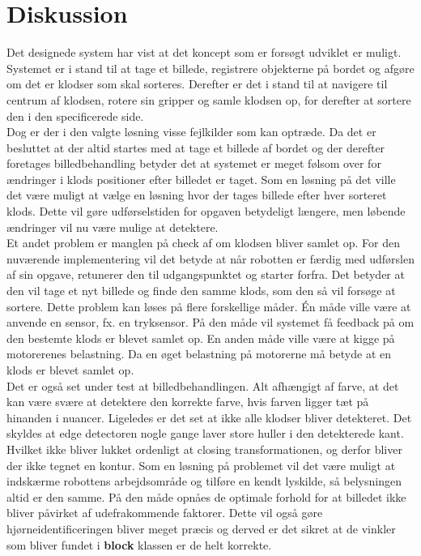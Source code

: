 \clearpage
\section{Diskussion}
Det designede system har vist at det koncept som er forsøgt udviklet er muligt. Systemet er i stand til at tage et billede, registrere objekterne på bordet og afgøre om det er klodser som skal sorteres. Derefter er det i stand til at navigere til centrum af klodsen, rotere sin gripper og samle klodsen op, for derefter at sortere den i den specificerede side.\\

Dog er der i den valgte løsning visse fejlkilder som kan optræde. Da det er besluttet at der altid startes med at tage et billede af bordet og der derefter foretages billedbehandling betyder det at systemet er meget følsom over for ændringer i klods positioner efter billedet er taget. Som en løsning på det ville det være muligt at vælge en løsning hvor der tages billede efter hver sorteret klods. Dette vil gøre udførselstiden for opgaven betydeligt længere, men løbende ændringer vil nu være mulige at detektere.\\ 

Et andet problem er manglen på check af om klodsen bliver samlet op. For den nuværende implementering vil det betyde at når robotten er færdig med udførslen af sin opgave, retunerer den til udgangspunktet og starter forfra. Det betyder at den vil tage et nyt billede og finde den samme klods, som den så vil forsøge at sortere. Dette problem kan løses på flere forskellige måder. Én måde ville være at anvende en sensor, fx. en tryksensor. På den måde vil systemet få feedback på om den bestemte klods er blevet samlet op. En anden måde ville være at kigge på motorerenes belastning. Da en øget belastning på motorerne må betyde at en klods er blevet samlet op.\\

Det er også set under test at billedbehandlingen. Alt afhængigt af farve, at det kan være svære at detektere den korrekte farve, hvis farven ligger tæt på hinanden i nuancer. Ligeledes er det set at ikke alle klodser bliver detekteret.
Det skyldes at edge detectoren nogle gange laver store huller i den detekterede kant. Hvilket ikke bliver lukket ordenligt at closing transformationen, og derfor bliver der ikke tegnet en kontur.
Som en løsning på problemet vil det være muligt at indskærme robottens arbejdsområde og tilføre en kendt lyskilde, så belysningen altid er den samme. På den måde opnåes de optimale forhold for at billedet ikke bliver påvirket af udefrakommende faktorer. Dette vil også gøre hjørneidentificeringen bliver meget præcis og derved er det sikret at de vinkler som bliver fundet i \textbf{block} klassen er de helt korrekte.\\

